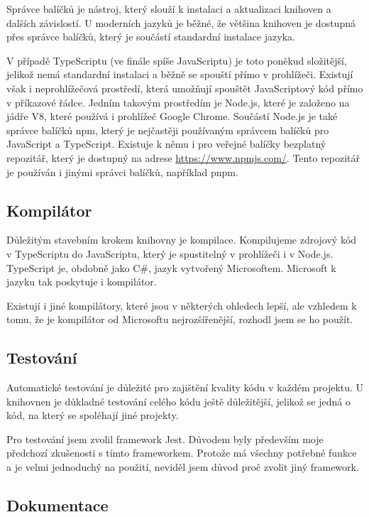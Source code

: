 Správce balíčků je nástroj, který slouží k instalaci a aktualizaci knihoven a dalších závislostí. 
U moderních jazyků je běžné, že většina knihoven je dostupná přes správce balíčků, který je součástí standardní instalace jazyka.

V případě TypeScriptu (ve finále spíše JavaScriptu) je toto poněkud složitější, jelikož nemá standardní instalaci a běžně se spouští přímo v prohlížeči.
Existují však i neprohlížečová prostředí, která umožňují spouštět JavaScriptový kód přímo v příkazové řádce. 
Jedním takovým prostředím je Node.js, které je založeno na jádře V8, které používá i prohlížeč Google Chrome.
Součástí Node.js je také správce balíčků npm, který je nejčastěji používaným správcem balíčků pro JavaScript a TypeScript. 
Existuje k němu i pro veřejné balíčky bezplatný repozitář, který je dostupný na adrese \url{https://www.npmjs.com/}.
Tento repozitář je používán i jinými správci balíčků, například pnpm.

\subsection{Kompilátor}

Důležitým stavebním krokem knihovny je kompilace. 
Kompilujeme zdrojový kód v TypeScriptu do JavaScriptu, který je spustitelný v prohlížeči i v Node.js. 
TypeScript je, obdobně jako C\#, jazyk vytvořený Microsoftem.
Microsoft k jazyku tak poskytuje i kompilátor.

Existují i jiné kompilátory, které jsou v některých ohledech lepší, ale vzhledem k tomu, že je kompilátor od Microsoftu nejrozšířenější, rozhodl jsem se ho použít.

\subsection{Testování}

Automatické testování je důležité pro zajištění kvality kódu v každém projektu. 
U knihovnen je důkladné testování celého kódu ještě důležitější, jelikož se jedná o kód, na který se spoléhají jiné projekty.

Pro testování jsem zvolil framework Jest.
Důvodem byly především moje předchozí zkušenosti s tímto frameworkem.
Protože má všechny potřebné funkce a je velmi jednoduchý na použití, neviděl jsem důvod proč zvolit jiný framework.

\subsection{Dokumentace}

